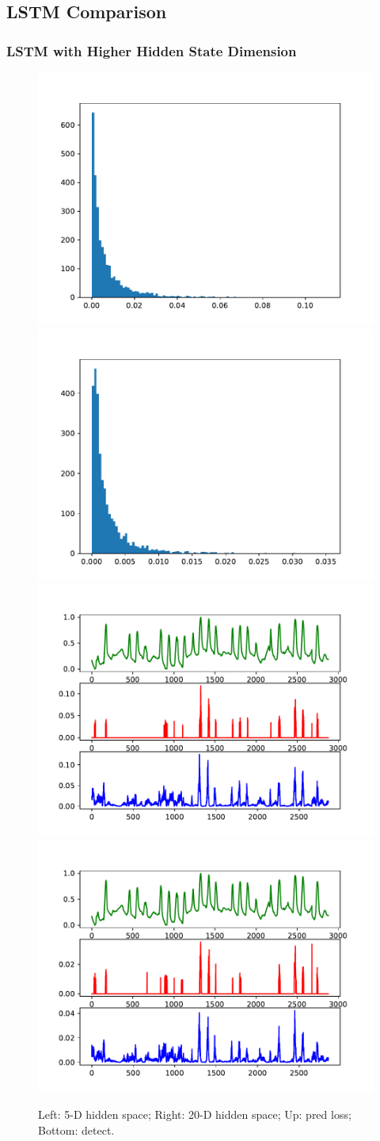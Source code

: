 \documentclass{beamer}
\begin{document}
\begin{frame}
\begin{frame}
\begin{frame}
\begin{frame}
\subsection{LSTM Comparison}
\begin{frame}
\frametitle{LSTM with Higher Hidden State Dimension}
\begin{figure}
\vspace{-0.1in}
\includegraphics[width=0.4\linewidth]{figs/lstm_dropout_test_h5_pred_loss_4layer.pdf}
\includegraphics[width=0.4\linewidth]{figs/lstm_dropout_test_h20_pred_loss_4layer.pdf}
\vspace{-0.2in}
\includegraphics[width=0.4\linewidth]{figs/lstm_dropout_test_h5_detect_4layer.pdf}
\includegraphics[width=0.4\linewidth]{figs/lstm_dropout_test_h20_detect_4layer.pdf}
\caption{Left: 5-D hidden space; Right: 20-D hidden space; Up: pred loss; Bottom: detect.}
\end{figure}
\end{frame}



\end{frame}
\end{frame}
\end{frame}
\end{frame}
\end{document}
